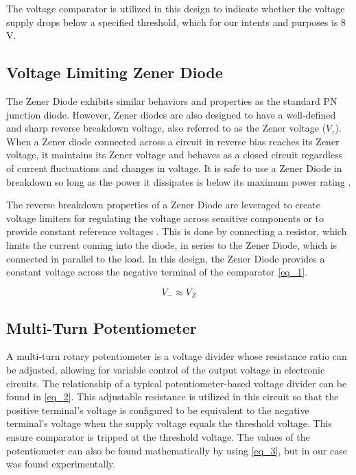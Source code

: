 \documentclass[conference]{IEEEtran}
\begin{document}
The voltage comparator is utilized in this design to indicate whether the voltage supply drops below a specified threshold, which for our intents and purposes is 8 V.

\subsection{Voltage Limiting Zener Diode}
The Zener Diode exhibits similar behaviors and properties as the standard PN junction diode. However, Zener diodes are also designed to have a well-defined and sharp reverse breakdown voltage, also referred to as the Zener voltage ($V_z$). When a Zener diode connected across a circuit in reverse bias reaches its Zener voltage, it maintains its Zener voltage and behaves as a closed circuit regardless of current fluctuations and changes in voltage. It is safe to use a Zener Diode in breakdown so long as the power it dissipates is below its maximum power rating \cite{week7}.


The reverse breakdown properties of a Zener Diode are leveraged to create voltage limiters for regulating the voltage across sensitive components or to provide constant reference voltages \cite{week7}. This is done by connecting a resistor, which limits the current coming into the diode, in series to the Zener Diode, which is connected in parallel to the load. In this design, the Zener Diode provides a constant voltage across the negative terminal of the comparator \eqref{eq_1}.

\begin{equation}
V_- \approx V_Z\label{eq_1}
\end{equation}

\subsection{Multi-Turn Potentiometer}

A multi-turn rotary potentiometer is a voltage divider whose resistance ratio can be adjusted, allowing for variable control of the output voltage in electronic circuits. The relationship of a typical potentiometer-based voltage divider can be found in \eqref{eq_2}. This adjustable resistance is utilized in this circuit so that the positive terminal's voltage is configured to be equivalent to the negative terminal's voltage when the supply voltage equals the threshold voltage. This ensure comparator is tripped at the threshold voltage. The values of the potentiometer can also be found mathematically by using \eqref{eq_3}, but in our case was found experimentally.
\end{document}

